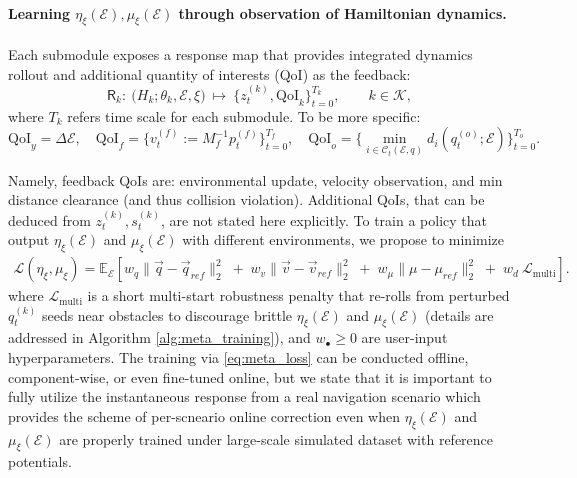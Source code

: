 \paragraph{Learning $\eta_{\xi}(\mathcal{E}), \mu_\xi(\mathcal{E})$ through observation of Hamiltonian dynamics.}
Each submodule exposes a response map that provides integrated dynamics rollout and additional quantity of interests (QoI) as the feedback:
\[
\mathsf{R}_k:\ \big(H_k;\theta_k,\mathcal E, \xi)\ \longmapsto\ 
\{z_t^{(k)}, \mathrm{QoI}_k\}_{t=0}^{T_k},\qquad k\in\mathcal{K},
\]
where $T_k$ refers time scale for each submodule. To be more specific:
\begin{equation}
    \mathrm{QoI}_{y}=\Delta\mathcal{E}, \quad \mathrm{QoI}_{f}=\{v_t^{(f)}:=M_f^{-1}p_t^{(f)}\}_{t=0}^{T_f} ,\quad \mathrm{QoI}_{o}= \{\min_{i\in\mathcal{C}_t(\mathcal{E},q)} d_i(q_t^{(o)};\mathcal{E})\}_{t=0}^{T_o}.
\end{equation}

Namely, feedback QoIs are: environmental update, velocity observation, and min distance clearance (and thus collision violation). Additional QoIs, that can be deduced from $z_t^{(k)},s_t^{(k)}$, are not stated here explicitly. To train a policy that output $\eta_{\xi}(\mathcal{E})$ and $\mu_{\xi}(\mathcal{E})$ with different environments, we propose to minimize
\begin{equation}
\label{eq:meta_loss}
\begin{aligned}
\mathcal L(\eta_\xi,\mu_\xi)
= \mathbb{E}_{\mathcal{E}}\left[
w_{q}\big\|\vec{q}-\vec{q}_{ref}\big\|_2^2
\;+\;
w_{v}\big\|\vec{v}-\vec{v}_{ref}\big\|_2^2
\;+\;
w_{\mu}\big\|\mu-\mu_{ref}\big\|_2^2
\;+\;
w_{d}\ \mathcal L_{\text{multi}}\right].
\end{aligned}
\end{equation}
where $\mathcal L_{\text{multi}}$ is a short multi-start robustness penalty that re-rolls from perturbed $q_t^{(k)}$ seeds near obstacles to discourage brittle $\eta_{\xi}(\mathcal{E})$ and $\mu_{\xi}(\mathcal{E})$ (details are addressed in Algorithm \ref{alg:meta_training}), and $w_{\bullet}\!\ge\!0$ are user-input hyperparameters. The training via \cref{eq:meta_loss} can be conducted offline, component-wise, or even fine-tuned online, but we state that it is important to fully utilize the instantaneous response from a real navigation scenario which provides the scheme of per-scneario online correction even when $\eta_\xi(\mathcal{E})$ and $\mu_\xi(\mathcal{E})$ are properly trained under large-scale simulated dataset with reference potentials.

